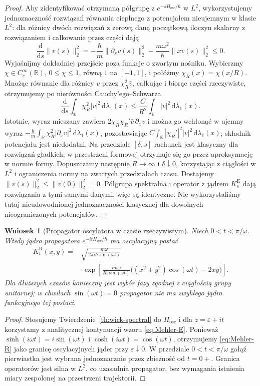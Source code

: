\documentclass[11pt,a4paper,oneside]{report}
\numberwithin{equation}{chapter}
\theoremstyle{plain}
\newtheorem{wniosek}[twierdzenie]{Wniosek}
\theoremstyle{definition}
\theoremstyle{remark}
\newcommand{\R}{\mathbb{R}}
\newcommand{\dd}{\mathrm{d}}
\begin{document}
\begin{proof}
Aby zidentyfikować otrzymaną półgrupę z
$e^{-sH_{\mathrm{osc}}/\hbar}$ w $L^2$, wykorzystujemy
jednoznaczność rozwiązań równania cieplnego z
potencjałem nieujemnym w klasie $L^2$: dla różnicy
dwóch rozwiązań z zerową daną początkową iloczyn skalarny
z rozwiązaniem i całkowanie przez części dają
\[
 \frac{\dd}{\dd s}\|v(s)\|_2^2
 =-\frac{\hbar}{m}\|\partial_xv(s)\|_2^2
  -\frac{m\omega^2}{\hbar}\|xv(s)\|_2^2\le0.
\]
Wyjaśnijmy dokładniej przejście poza funkcje o zwartym
nośniku. Wybierzmy $\chi\in C_c^\infty(\R)$, $0\le\chi\le1$,
równą $1$ na $[-1,1]$, i połóżmy $\chi_R(x)=\chi(x/R)$.
Mnożąc równanie dla różnicy $v$ przez $\chi_R^2\bar v$,
całkując i biorąc części rzeczywiste, otrzymujemy po
nierówności Cauchy'ego--Schwarza
\[
\frac{\dd}{\dd s}\int_{\R}\chi_R^2|v|^2\,\dd\lambda_1(x)
\le \frac{C}{R^2}\int_{\R}|v|^2\,\dd\lambda_1(x).
\]
Istotnie, wyraz mieszany zawiera
$2\chi_R\chi_R'\bar v\,\partial_xv$ i można go
wchłonąć w ujemny wyraz
$-\frac{\hbar}{m}\int_{\R}\chi_R^2|\partial_xv|^2\,\dd\lambda_1(x)$,
pozostawiając $C\int_{\R}|\chi_R'|^2|v|^2\,\dd\lambda_1(x)$;
składnik potencjału jest niedodatni. Na przedziale
$[\delta,s]$ rachunek jest klasyczny dla rozwiązań
gładkich; w przestrzeni formowej otrzymuje się go przez
aproksymację w normie formy. Dopuszczamy następnie
$R\to\infty$ i $\delta\downarrow0$, korzystając z
ciągłości w $L^2$ i ograniczenia normy na zwartych
przedziałach czasu. Dostajemy
$\|v(s)\|_2^2\le\|v(0)\|_2^2=0$.
Półgrupa spektralna i operator z jądrem $K_s^{\mathrm E}$
dają rozwiązania z tymi samymi danymi, więc są identyczne.
Nie wykorzystaliśmy tutaj nieudowodnionej jednoznaczności
klasycznej dla dowolnych nieograniczonych potencjałów.
\end{proof}

\begin{wniosek}[Propagator oscylatora w czasie rzeczywistym]\label{cor:volIII:16:01}
\label{cor:Mehler-real}
Niech $0<t<\pi/\omega$. Wtedy jądro propagatora
$e^{-itH_{\mathrm{osc}}/\hbar}$ ma oscylacyjną postać
\[
\begin{split}
 K_t^{\mathrm R}(x,y)
  ={}&\sqrt{\frac{m\omega}{2\pi i\hbar\sin(\omega t)}}\\
 &\cdot\exp\left[\frac{im\omega}{2\hbar\sin(\omega t)}
 \bigl((x^2+y^2)\cos(\omega t)-2xy\bigr)\right].
\end{split}
\tag{16.12}\label{eq:Mehler-R}
\]
Dla dłuższych czasów konieczny jest wybór fazy
zgodnej z ciągłością grupy unitarnej; w chwilach
$\sin(\omega t)=0$ propagator nie ma zwykłego jądra
funkcyjnego tej postaci.
\end{wniosek}
\begin{proof}
Stosujemy Twierdzenie~\ref{th:wick-spectral} do
$H_{\mathrm{osc}}$ i dla $z=\varepsilon+it$ korzystamy
z analitycznej kontynuacji wzoru \eqref{eq:Mehler-E}.
Ponieważ $\sinh(i\omega t)=i\sin(\omega t)$ i
$\cosh(i\omega t)=\cos(\omega t)$, otrzymujemy
\eqref{eq:Mehler-R} jako granicę oscylacyjnych jąder
przy $\varepsilon\downarrow0$. W przedziale
$0<t<\pi/\omega$ gałąź pierwiastka jest wybrana
jednoznacznie przez zbieżność od $t=0+$.
Granica operatorów jest silna w $L^2$, co uzasadnia
propagator, bez wymagania istnienia miary zespolonej
na przestrzeni trajektorii.
\end{proof}
\end{document}
